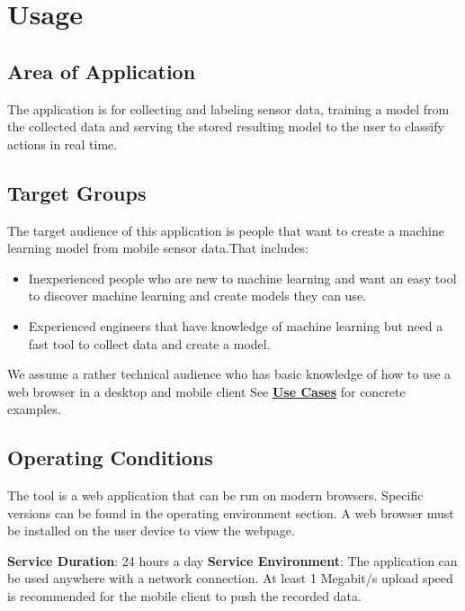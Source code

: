 \section{Usage}
\subsection{Area of Application}
The application is for collecting and labeling sensor data, training a model from the collected data and serving the stored resulting model to the user to classify actions in real time.

\subsection{Target Groups}
The target audience of this application is people that want to create a machine learning model from mobile sensor data.That includes:
\begin{itemize}
    \item Inexperienced people who are new to machine learning and want an easy tool to discover machine learning and create models they can use.
    \item Experienced engineers that have knowledge of machine learning but need a fast tool to collect data and create a model.
\end{itemize}
We assume a rather technical audience who has basic knowledge of how to use a web browser in a desktop and mobile client See \hyperref[Use Cases]{\textbf{Use Cases}} for concrete examples.

\subsection{Operating Conditions}
The tool is a web application that can be run on modern browsers. Specific versions can be found in the operating environment section. A web browser must be installed on the user device to view the webpage.

\textbf{Service Duration}: 24 hours a day
\newline
\newline
\textbf{Service Environment}: The application can be used anywhere with a network connection. At least 1 Megabit/s upload speed is recommended for the mobile client to push the recorded data.